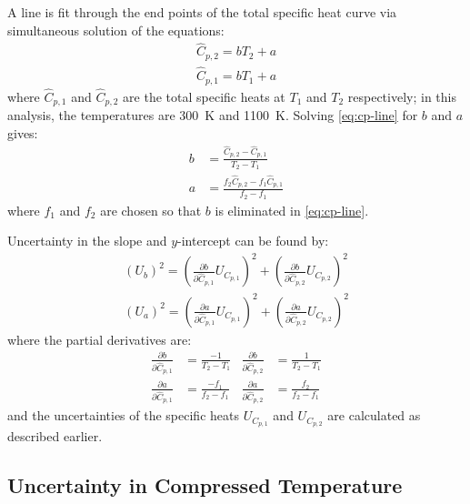 \documentclass[../main.tex]{subfiles}
\begin{document}
A line is fit through the end points of the total specific heat curve
via simultaneous solution of the equations:
%
\begin{equation}
\label{eq:cp-line}
\begin{split}
\hat{C}_{p,2} = b T_2 + a \\
\hat{C}_{p,1} = b T_1 + a
\end{split}
\end{equation}
%
where $\hat{C}_{p,1}$ and $\hat{C}_{p,2}$ are the total specific heats
at $T_1$ and $T_2$ respectively; in this analysis, the temperatures are
\SI{300}{\kelvin} and \SI{1100}{\kelvin}. Solving \cref{eq:cp-line} for
$b$ and $a$ gives:
%
\begin{equation}
\begin{split}
b &= \frac{\hat{C}_{p,2} - \hat{C}_{p,1}}{T_2 - T_1} \\[0.5em]
a &= \frac{f_2 \hat{C}_{p,2} - f_1 \hat{C}_{p,1}}{f_2-f_1}
\end{split}
\end{equation}
%
where $f_1$ and $f_2$ are chosen so that $b$ is eliminated in
\cref{eq:cp-line}.

Uncertainty in the slope and $y$-intercept can be found by:
%
\begin{equation}
\begin{split}
\left(U_{b}\right)^2 = \left(\frac{\partial b}{\partial \hat{C}_{p,1}}U_{C_{p,1}}\right)^2 + \left(\frac{\partial b}{\partial \hat{C}_{p,2}}U_{C_{p,2}}\right)^2 \\[0.5em]
\left(U_{a}\right)^2 = \left(\frac{\partial a}{\partial \hat{C}_{p,1}}U_{C_{p,1}}\right)^2 + \left(\frac{\partial a}{\partial \hat{C}_{p,2}}U_{C_{p,2}}\right)^2
\end{split}
\end{equation}
%
where the partial derivatives are:
%
\begin{align}
\frac{\partial b}{\partial \hat{C}_{p,1}} &= \frac{-1}{T_2 - T_1} & \frac{\partial b}{\partial \hat{C}_{p,2}} &= \frac{1}{T_2 - T_1} \\
\frac{\partial a}{\partial \hat{C}_{p,1}} &= \frac{-f_1}{f_2 - f_1} & \frac{\partial a}{\partial \hat{C}_{p,2}} &= \frac{f_2}{f_2 - f_1}
\end{align}
%
and the uncertainties of the specific heats $U_{C_{p,1}}$ and $U_{C_{p,2}}$
are calculated as described earlier.

\subsection{Uncertainty in Compressed Temperature}
\end{document}

